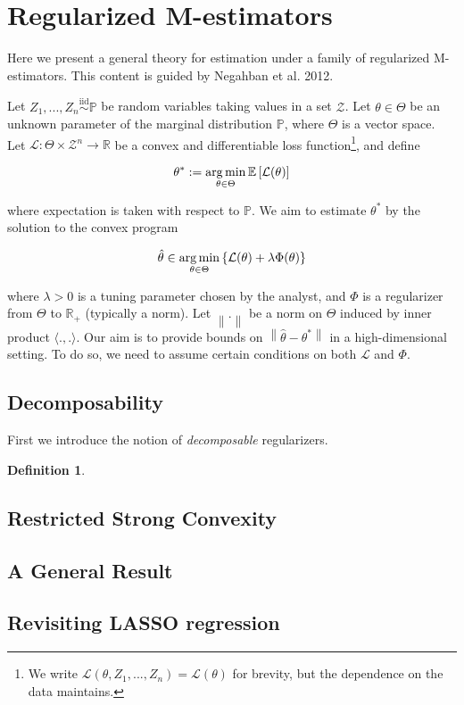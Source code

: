 \documentclass{article}
\newcommand{\R}{\mathbb{R}}
\newcommand{\bbP}{\mathbb{P}}
\newcommand{\cL}{\mathcal{L}}
\newcommand{\cZ}{\mathcal{Z}}
\newcommand{\argmin}{\mathop{\rm arg\,min}}
\newcommand{\ev}[1]{\mathbb{E}\left[#1\right]}
\newcommand{\iid}{\overset{\textrm{iid}}{\sim}}
\newcommand{\norm}[1]{\left\|#1\right\|}
\newcommand{\ip}[2]{\langle #1, #2 \rangle}
\newtheorem{definition}{Definition}
\begin{document}
\section{Regularized M-estimators}

Here we present a general theory for estimation under a family of regularized M-estimators. This content is guided by Negahban et al. 2012.

Let $Z_{1}, ..., Z_{n} \iid \bbP$ be random variables taking values in a set $\cZ$. Let $\theta \in \Theta$ be an unknown parameter of the marginal distribution $\bbP$, where $\Theta$ is a vector space. Let $\cL : \Theta \times \cZ^{n} \rightarrow \R$ be a convex and differentiable loss function\footnote{We write $\cL(\theta, Z_{1}, ..., Z_{n}) = \cL(\theta)$ for brevity, but the dependence on the data maintains.}, and define

$$\theta^{*} := \argmin_{\theta \in \Theta}\ev{\cL(\theta)}$$

where expectation is taken with respect to $\bbP$. We aim to estimate $\theta^{*}$ by the solution to the convex program

$$\hat{\theta} \in \argmin_{\theta \in \Theta}\left\{\cL(\theta) + \lambda\Phi(\theta)\right\}$$

where $\lambda > 0$ is a tuning parameter chosen by the analyst, and $\Phi$ is a regularizer from $\Theta$ to $\R_{+}$ (typically a norm). Let $\norm{.}$ be a norm on $\Theta$ induced by inner product $\ip{.}{.}$. Our aim is to provide bounds on $\norm{\hat{\theta} - \theta^{*}}$ in a high-dimensional setting. To do so, we need to assume certain conditions on both $\cL$ and $\Phi$.

\subsection{Decomposability}

First we introduce the notion of \textit{decomposable} regularizers.

\begin{definition}

\end{definition}


\subsection{Restricted Strong Convexity}

\subsection{A General Result}

\subsection{Revisiting LASSO regression}
\end{document}
